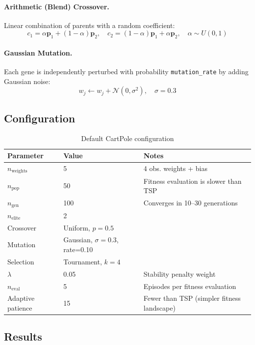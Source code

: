 \documentclass[12pt,a4paper]{article}
\begin{document}
\paragraph{Arithmetic (Blend) Crossover.}
Linear combination of parents with a random coefficient:
\[
c_1 = \alpha \mathbf{p}_1 + (1-\alpha)\mathbf{p}_2, \quad c_2 = (1-\alpha)\mathbf{p}_1 + \alpha\mathbf{p}_2, \quad \alpha \sim U(0,1)
\]

\paragraph{Gaussian Mutation.}
Each gene is independently perturbed with probability \texttt{mutation\_rate} by adding Gaussian noise:
\[
w_j \leftarrow w_j + \mathcal{N}(0, \sigma^2), \quad \sigma = 0.3
\]

\subsection{Configuration}

\begin{table}[H]
\centering
\caption{Default CartPole configuration}
\label{tab:cp_config}
\begin{tabular}{lll}
\toprule
\textbf{Parameter} & \textbf{Value} & \textbf{Notes} \\
\midrule
$n_\text{weights}$ & 5 & 4 obs. weights + bias \\
$n_\text{pop}$ & 50 & Fitness evaluation is slower than TSP \\
$n_\text{gen}$ & 100 & Converges in 10--30 generations \\
$n_\text{elite}$ & 2 & \\
Crossover & Uniform, $p=0.5$ & \\
Mutation & Gaussian, $\sigma=0.3$, rate=0.10 & \\
Selection & Tournament, $k=4$ & \\
$\lambda$ & 0.05 & Stability penalty weight \\
$n_\text{eval}$ & 5 & Episodes per fitness evaluation \\
Adaptive patience & 15 & Fewer than TSP (simpler fitness landscape) \\
\bottomrule
\end{tabular}
\end{table}

\subsection{Results}
\end{document}
